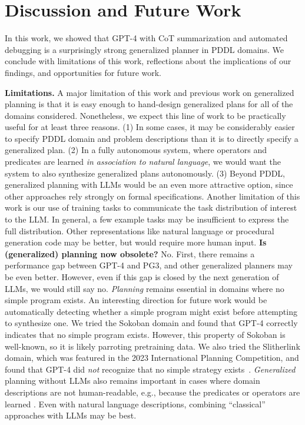 \documentclass[letterpaper]{article} %
\begin{document}
\vspace{-1.51mm}
\section{Discussion and Future Work}

In this work, we showed that GPT-4 with CoT summarization and automated debugging is a surprisingly strong generalized planner in PDDL domains.
We conclude with limitations of this work, reflections about the implications of our findings, and opportunities for future work.

\textbf{Limitations.}
A major limitation of this work and previous work on generalized planning is that it is easy enough to hand-design generalized plans for all of the domains considered.
Nonetheless, we expect this line of work to be practically useful for at least three reasons.
(1) In some cases, it may be considerably easier to specify PDDL domain and problem descriptions than it is to directly specify a generalized plan.
(2) In a fully autonomous system, where operators and predicates are learned \emph{in association to natural language}, we would want the system to also synthesize generalized plans autonomously.
(3) Beyond PDDL, generalized planning with LLMs would be an even more attractive option, since other approaches rely strongly on formal specifications.
Another limitation of this work is our use of training tasks to communicate the task distribution of interest to the LLM.
In general, a few example tasks may be insufficient to express the full distribution.
Other representations like natural language or procedural generation code may be better, but would require more human input.  \textbf{Is (generalized) planning now obsolete?}
No.
First, there remains a performance gap between GPT-4 and PG3, and other generalized planners may be even better.
However, even if this gap is closed by the next generation of LLMs, we would still say no.
\emph{Planning} remains essential in domains where no simple program exists.
An interesting direction for future work would be automatically detecting whether a simple program might exist before attempting to synthesize one.
We tried the Sokoban domain and found that GPT-4 correctly indicates that no simple program exists.
However, this property of Sokoban is well-known, so it is likely parroting pretraining data.
We also tried the Slitherlink domain, which was featured in the 2023 International Planning Competition, and found that GPT-4 did \emph{not} recognize that no simple strategy exists~\cite{Yato2003OnTN}.
\emph{Generalized} planning without LLMs also remains important in cases where domain descriptions are not human-readable, e.g., because the predicates or operators are learned
\cite{silver2023inventing}.
Even with natural language descriptions, combining ``classical'' approaches with LLMs may be best.
\end{document}
